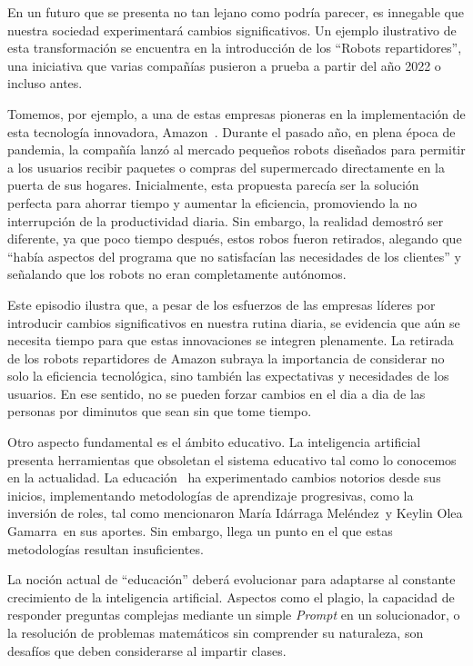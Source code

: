 \documentclass[letterpaper, 12pt]{article}
\newcommand{\memberMaria}{María Idárraga Meléndez~}
\newcommand{\memberKeys}{Keylin Olea Gamarra~}
\begin{document}
En un futuro que se presenta no tan lejano como podría
parecer, es innegable que nuestra sociedad experimentará
cambios significativos. Un ejemplo ilustrativo de esta
transformación se encuentra en la introducción de los
``Robots repartidores'', una iniciativa que varias
compañías pusieron a prueba a partir del año 2022 o incluso
antes.

Tomemos, por ejemplo, a una de estas empresas pioneras en
la implementación de esta tecnología innovadora,
Amazon~\cite{Erard_2022}. Durante el pasado año, en plena
época de pandemia, la compañía lanzó al mercado pequeños
robots diseñados para permitir a los usuarios recibir
paquetes o compras del supermercado directamente en la
puerta de sus hogares. Inicialmente, esta propuesta parecía
ser la solución perfecta para ahorrar tiempo y aumentar la
eficiencia, promoviendo la no interrupción de la
productividad diaria. Sin embargo, la realidad demostró ser
diferente, ya que poco tiempo después, estos robos fueron
retirados, alegando que ``había aspectos del programa que
no satisfacían las necesidades de los clientes'' y
señalando que los robots no eran completamente autónomos.

Este episodio ilustra que, a pesar de los esfuerzos de las
empresas líderes por introducir cambios significativos en
nuestra rutina diaria, se evidencia que aún se necesita
tiempo para que estas innovaciones se integren plenamente.
La retirada de los robots repartidores de Amazon subraya la
importancia de considerar no solo la eficiencia
tecnológica, sino también las expectativas y necesidades de
los usuarios. En ese sentido, no se pueden forzar cambios
en el dia a dia de las personas por diminutos que sean sin
que tome tiempo.

Otro aspecto fundamental es el ámbito educativo. La
inteligencia artificial presenta herramientas que obsoletan
el sistema educativo tal como lo conocemos en la
actualidad. La educación~\cite{educacion_evolución} ha
experimentado cambios notorios desde sus inicios,
implementando metodologías de aprendizaje progresivas, como
la inversión de roles, tal como mencionaron \memberMaria y
\memberKeys en sus aportes. Sin embargo, llega un punto en
el que estas metodologías resultan insuficientes.

La noción actual de ``educación'' deberá evolucionar para
adaptarse al constante crecimiento de la inteligencia
artificial. Aspectos como el plagio, la capacidad de
responder preguntas complejas mediante un simple
\textit{Prompt} en un solucionador, o la resolución de
problemas matemáticos sin comprender su naturaleza, son
desafíos que deben considerarse al impartir clases.
\end{document}
